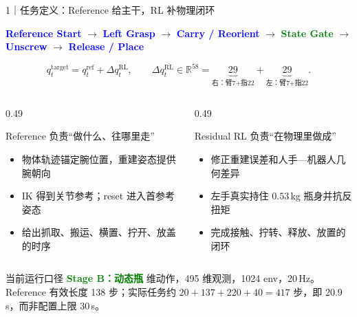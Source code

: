 \documentclass[aspectratio=169,10pt]{ctexbeamer}
\newcommand{\status}[2]{%
  \begingroup\setlength{\fboxsep}{0.4ex}%
  \colorbox{#1!12}{\textcolor{#1}{\bfseries\scriptsize #2}}%
  \endgroup}
\begin{document}
\begin{frame}[t]{1｜任务定义：Reference 给主干，RL 补物理闭环}
  \begin{center}
    \scriptsize
    \status{Blue}{Reference Start}\;$\rightarrow$\;
    \status{Blue}{Left Grasp}\;$\rightarrow$\;
    \status{Blue}{Carry / Reorient}\;$\rightarrow$\;
    \status{Green}{State Gate}\;$\rightarrow$\;
    \status{Blue}{Unscrew}\;$\rightarrow$\;
    \status{Blue}{Release / Place}
  \end{center}

  \vspace{-0.3em}
  \[
    q_t^{\mathrm{target}}=q_t^{\mathrm{ref}}+\Delta q_t^{\mathrm{RL}},
    \qquad \Delta q_t^{\mathrm{RL}}\in\mathbb{R}^{58}
    =\underbrace{29}_{\text{右：臂7+指22}}+\underbrace{29}_{\text{左：臂7+指22}}.
  \]

  \begin{columns}[T,onlytextwidth]
    \begin{column}{0.49\textwidth}
      \begin{block}{Reference 负责“做什么、往哪里走”}
        \begin{itemize}
          \item 物体轨迹锚定腕位置，重建姿态提供腕朝向
          \item IK 得到关节参考；reset 进入首参考姿态
          \item 给出抓取、搬运、横置、拧开、放盖的时序
        \end{itemize}
      \end{block}
    \end{column}
    \begin{column}{0.49\textwidth}
      \begin{block}{Residual RL 负责“在物理里做成”}
        \begin{itemize}
          \item 修正重建误差和人手—机器人几何差异
          \item 左手真实持住 $0.53$\,kg 瓶身并抗反扭矩
          \item 完成接触、拧转、释放、放置的闭环
        \end{itemize}
      \end{block}
    \end{column}
  \end{columns}

  \begin{block}{当前运行口径}
    \status{Green}{Stage B：动态瓶} 维动作，495 维观测，1024 env，20\,Hz。
    Reference 有效长度 138 步；实际任务约 $20+137+220+40=417$ 步，即 20.9\,s，而非配置上限 30\,s。
  \end{block}
\end{frame}
\end{document}
